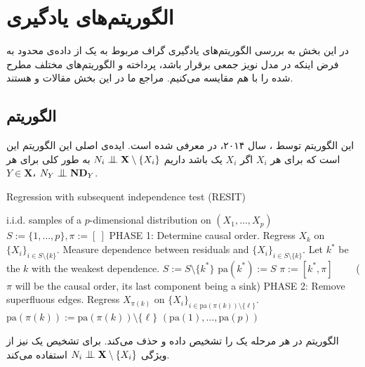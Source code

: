 \documentclass[a4paper,12pt]{article}
\newcommand{\bigCI}{\mathrel{\text{\scalebox{1.07}{$\perp\mkern-10mu\perp$}}}}
\begin{document}
\section{الگوریتم‌های یادگیری}

در این بخش به بررسی الگوریتم‌های یادگیری گراف مربوط به یک 
از داده‌ی محدود به فرض اینکه  در
مدل نویز جمعی برقرار باشد، پرداخته و الگوریتم‌های مختلف مطرح شده را با هم مقایسه می‌کنیم. مراجع ما در این بخش مقالات 
\cite{continous}
و 
\cite{nowzohour}
هستند.
\subsection{الگوریتم 
}
این الگوریتم توسط 
،
سال ۲۰۱۴، در
\cite{continous}
معرفی شده است. ایده‌ی اصلی این الگوریتم این است که برای هر $X_i$ اگر $X_i$ یک
باشد داریم
$N_i \bigCI \mathbf{X} \setminus \{X_i\}$
به طور کلی برای هر 
$Y \in \mathbf{X}$،
$N_Y \bigCI \mathbf{ND}_Y$.

\begin{latin}	
	\begin{algorithm}[h]
		\caption{Regression with subsequent independence test (RESIT)}
		\label{alg:icml}
		\begin{algorithmic}[1]
			 i.i.d. samples of a $p$-dimensional distribution on $(X_1, \ldots, X_p)$ \vspace{0.0cm}
			\STATE $S:=\{1, \ldots, p\}, \pi := [\ ]$ \vspace{0.15cm}
			\STATE PHASE 1: Determine causal order.
			\REPEAT
			\STATE Regress $X_k$ on $\{X_i\}_{i \in S \setminus \{k\}}$.%
			\STATE Measure dependence between residuals and $\{X_i\}_{i \in S \setminus \{k\}}$.  
			\ENDFOR
			\STATE Let $k^*$ be the $k$ with the weakest dependence.
			\STATE $S:=S \setminus \{k^*\}$
			\STATE $\mathrm{pa}(k^*):=S$
			\STATE $\pi := [k^*, \pi]\qquad $  ($\pi$ will be the causal order, its last component being a sink)
			 \vspace{0.15cm}
			\STATE PHASE 2: Remove superfluous edges.
			\STATE Regress $X_{\pi(k)}$ on $\{X_i\}_{i \in \mathrm{pa}(\pi(k)) \setminus \{\ell\}}$.
			\STATE $\mathrm{pa}(\pi(k)) := \mathrm{pa}(\pi(k)) \setminus \{\ell \}$ 
			\ENDIF
			\ENDFOR
			\ENDFOR
			 $(\mathrm{pa}(1), \ldots, \mathrm{pa}(p))$
		\end{algorithmic}
	\end{algorithm}
\end{latin}	
الگوریتم 
در هر مرحله یک 
را تشخیص داده و حذف می‌کند. برای تشخیص یک 
نیز از ويژگی $N_i \bigCI \mathbf{X} \setminus \{X_i\}$ استفاده می‌کند. 
\end{document}
